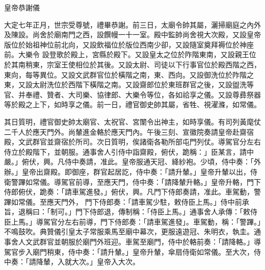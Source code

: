 \begin{pinyinscope}
 皇帝恭謝儀



 大定七年正月，世宗受尊號，禮畢恭謝。前三日，太廟令帥其屬，灑掃廟庭之內外及陳設。尚舍於廟南門之西，設饌幔一十一室。殿中監帥尚舍視大次殿，又設皇帝版位於始祖神位前北向，又設飲福位於版位西南少卻，又設隨室奠拜褥位於神座前。大樂令
 設登歌於殿上，宮縣於殿下。又設皇太之位於阼階東南，又設親王位於其南稍東，宗室王使相位於其後。又設太尉、司徒以下行事官位於殿西階之西，東向，每等異位。又設文武群官位於橫階之南，東、西向。又設御洗位於阼階之東，又設太尉洗位於西階下橫階之南。又設齋郎位於東班群官之後，又設盥洗等官、并奉禮、贊者、大司樂、協律郎、大樂令等位，各如祫享之儀。又設尊彞祭器等於殿之上下，如時享之儀。前一日，禮官御史帥其屬，省牲、視濯滌，如常儀。



 其日質明，禮官御史帥太廟官、太祝官、宮闈令出神主，如時享儀。有司列黃麾仗
 二千人於應天門外。尚輦進金輅於應天門內。午後三刻、宣徽院奏請皇帝赴齋宿殿，文武群官並齋宿於所司。次日質明，俟諸衛各勒所部屯門列仗。導駕官分左右侍立於殿階下，並朝服。通事舍人引侍中詣齋殿，俯伏，跪稱：」臣某言，請中嚴。」俯伏，興。凡侍中奏請，准此。皇帝服通天冠、絳紗袍。少頃，侍中奏：「外辦。」皇帝出齋殿。即御座，群官起居訖，侍中奏：「請升輦。」皇帝升輦以出，侍衛警蹕如常儀。導駕官前導，至應天門，侍中奏：「請降輦升輅。」皇帝升輅，門下侍郎俯伏，跪奏：「請車駕進發。」俯伏，興。凡門下侍郎奏請，准此。車駕動，警蹕如常儀。至應天門外，
 門下侍郎奏：「請車駕少駐，敕侍臣上馬。」侍中前承旨，退稱曰：「制可。」門下侍郎退，傳制稱：「侍臣上馬。」通事舍人承傳：「敕侍臣上馬。」導駕官分左右前導，門下侍郎奏：「請車駕進發」。車駕動，稱：「警蹕。」不鳴鼓吹。典贊儀引皇太子常服乘馬至廟中幕次，更服遠遊冠、朱明衣，執圭。通事舍人文武群官並朝服於廟門外班迎。車駕至廟門，侍中於輅前奏：「請降輅。」導駕官步入廟門稍東，侍中奏：「請升輦。」皇帝升輦，傘扇侍衛如常儀。至大次，侍中奏：「請降輦，入就大次。」皇帝入大次。




\end{pinyinscope}
